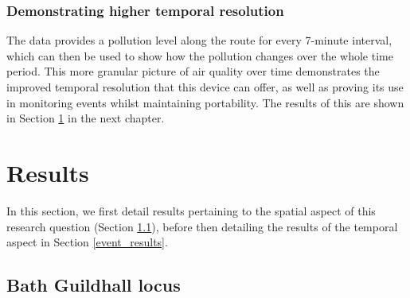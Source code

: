 \documentclass[11pt]{report}
\begin{document}
\subsubsection{Demonstrating higher temporal resolution}

The data provides a pollution level along the route for every 7-minute interval, which can then be used to show how the pollution changes over the whole time period. This more granular picture of air quality over time demonstrates the improved temporal resolution that this device can offer, as well as proving its use in monitoring events whilst maintaining portability. The results of this are shown in Section \ref{results:q2} in the next chapter.

\section{Results} \label{results:q2}

In this section, we first detail results pertaining to the spatial aspect of this research question (Section \ref{locus_results}), before then detailing the results of the temporal aspect in Section \ref{event_results}.

\subsection{Bath Guildhall locus} \label{locus_results}
\end{document}
